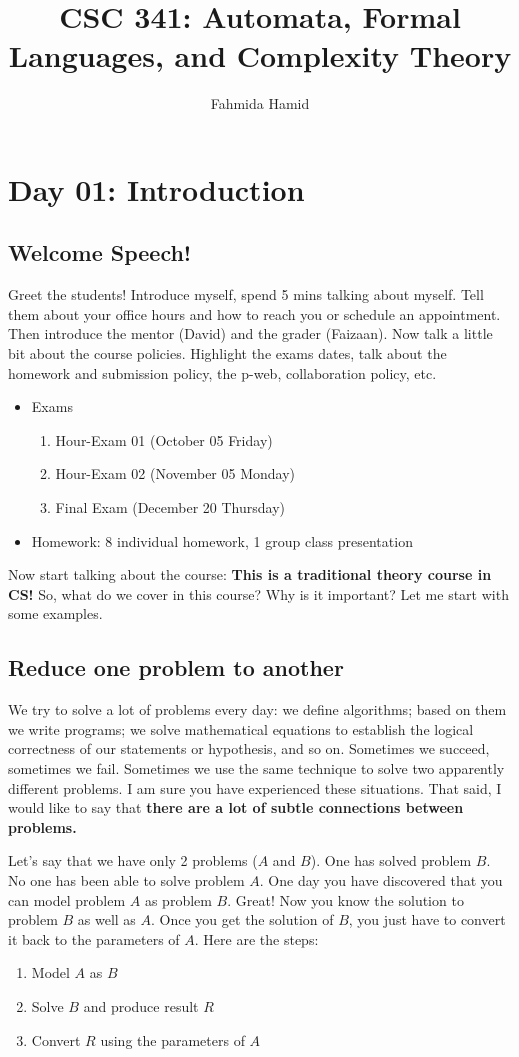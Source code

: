 \documentclass[11pt, oneside]{article}   	%
\title{CSC 341: Automata, Formal Languages, and Complexity Theory}
\author{Fahmida Hamid}
\begin{document}
\maketitle
\section{Day 01: Introduction}
\subsection{Welcome Speech!}
Greet the students!
Introduce myself, spend 5 mins talking about myself. Tell them about your office hours and how to reach you or schedule an appointment. Then introduce the mentor (David) and the grader (Faizaan). Now talk a little bit about the course policies. Highlight the exams dates, talk about the homework and submission policy, the p-web, collaboration policy, etc.
\begin{itemize}
\item Exams
\begin{enumerate}
\item Hour-Exam 01 (October 05 Friday)
\item Hour-Exam 02 (November 05 Monday)
\item Final Exam (December 20 Thursday)
\end{enumerate}
\item Homework: 8 individual homework, 1 group class presentation
\end{itemize}
Now start talking about the course: {\bf This is a traditional theory course in CS!} So, what do we cover in this course? Why is it important? Let me start with some examples. 

\subsection{Reduce one problem to another}
We try to solve a lot of problems every day: we define algorithms; based on them we write programs; we solve mathematical equations to establish the logical correctness of our statements or hypothesis, and so on. Sometimes we succeed, sometimes we fail. Sometimes we use the same technique	 to solve two apparently different problems. I am sure you have experienced these situations. That said, I would like to say that {\bf there are a lot of subtle connections between problems.} 
\par Let's say that we have only 2 problems ($A$ and $B$). One has solved problem $B$. No one has been able to solve problem $A$. One day you have discovered that you can model problem $A$ as problem $B$. Great! Now you know the solution to problem $B$ as well as $A$. Once you get the solution of $B$, you just have to convert it back to the parameters of $A$. 
Here are the steps:
\begin{enumerate}
\item Model $A$ as $B$
\item Solve $B$ and produce result $R$
\item Convert $R$ using the parameters of $A$
\end{enumerate}
\end{document}
